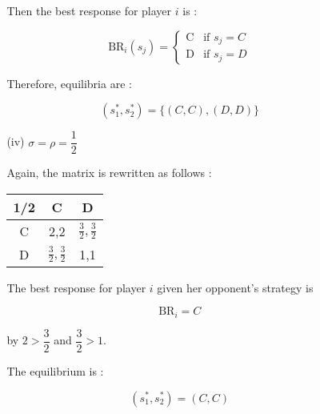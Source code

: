 \documentclass{jsarticle}
\begin{document}
\begin{enumerate}
\begin{enumerate}
\begin{enumerate}
\begin{center}
\end{center}

Then the best response for player $i$ is :

\[\text{BR}_i(s_j)=\begin{cases}
\text{C} & \text{if } s_j=C \\
\text{D} & \text{if } s_j=D
\end{cases} \]

Therefore, equilibria are :

\[ (s_1^*,s_2^*)=\{(C,C),(D,D) \} \]

\item[(iv)] $\sigma=\rho=\dfrac{1}{2}$

Again, the matrix is rewritten as follows :

\begin{center}

\begin{tabular}{|c|c|c|} \hline
1/2 & C & D \\ \hline
C & 2,2 & $\frac{3}{2},\frac{3}{2}$ \\ \hline
D & $\frac{3}{2},\frac{3}{2}$ & 1,1 \\ \hline
\end{tabular}

\end{center}

The best response for player $i$ given her opponent's strategy is

\[ \text{BR}_i=C \]

by $2>\dfrac{3}{2}$ and $\dfrac{3}{2}>1$.

The equilibrium is :

\[(s_1^*,s_2^*)=(C,C) \]

\end{enumerate}


\end{enumerate}

\end{enumerate}
\end{document}
